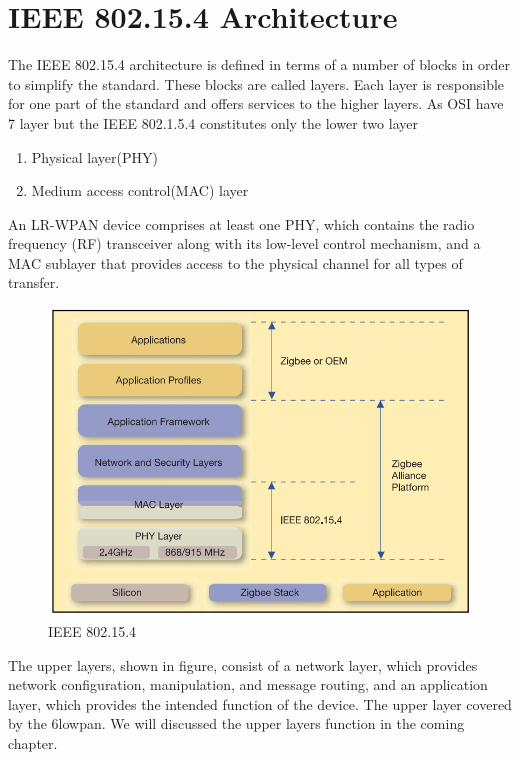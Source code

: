 \section{IEEE 802.15.4 Architecture}
The IEEE 802.15.4 architecture is defined in terms of a number of blocks in order to simplify the standard. These blocks are called layers. Each layer is responsible for one part of the standard and offers services to the higher layers. As OSI have 7 layer but the IEEE 802.1.5.4 constitutes only the lower two layer\\
\begin{enumerate}

	\item{Physical layer(PHY)}
	\item{Medium access control(MAC) layer}
\end{enumerate}
	An LR-WPAN device comprises at least one PHY, which contains the radio frequency (RF) transceiver along with its low-level control mechanism, and a MAC sublayer that provides access to the physical channel for all types of transfer.



\begin{figure}[ht]
	\centering
	\includegraphics[scale=0.7]{images/ieee.png}
	\caption{IEEE 802.15.4}
\end{figure}
The upper layers, shown in figure, consist of a network layer, which provides network configuration, manipulation, and message routing, and an application layer, which provides the intended function of the device. The upper layer covered by the 6lowpan. We will discussed the upper layers function in the coming chapter.
